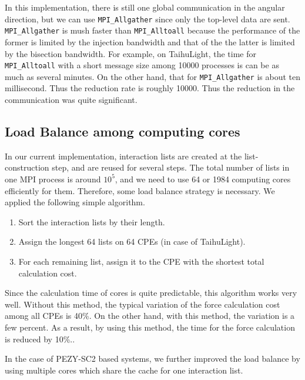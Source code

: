 \documentclass[Afour,sageh,times]{sagej}
\newcommand{\rev}[1]{{#1}}
\begin{document}
In this implementation, there is still one global communication in the
angular direction, but we can use {\tt MPI\_Allgather} since only the
top-level data are sent. \rev{ {\tt MPI\_Allgather} is mush faster
  than {\tt MPI\_Alltoall} because the performance of the former is
  limited by the injection bandwidth and that of the the latter is
  limited by the bisection bandwidth. For example, on TaihuLight, the
  time for {\tt MPI\_Alltoall} with a short message size among 10000
  processes is can be as much as several minutes. On the other hand,
  that for {\tt MPI\_Allgather} is about ten millisecond. Thus the
  reduction rate is roughly 10000.}  Thus the reduction in the
communication was quite significant.


\subsection{Load Balance among computing cores}
\label{subsec:force}

In our current implementation, interaction lists are created at the
list-construction step, and are reused for several steps. The total
number of lists in one MPI process is around $10^5$, and we need to
use 64 or 1984 computing cores efficiently for them. Therefore, some
load balance strategy is necessary. We applied the following simple
algorithm.

\begin{enumerate}
  
\item Sort the interaction lists by their length.

\item Assign the longest 64 lists on 64 CPEs (in case of TaihuLight).

\item For each remaining list, assign it to the CPE with the shortest
  total calculation cost.
  
\end{enumerate}

Since the calculation time of cores is quite predictable, this
algorithm works very well. \rev{Without this method, the typical
  variation of the force calculation cost among all CPEs is 40\%. On
  the other hand, with this method, the variation is a few percent. As
  a result, by using this method, the time for the force calculation
  is reduced by 10\%..}

In the case of PEZY-SC2 based systems, we further improved the load
balance by using multiple cores which share the cache for one
interaction list.
\end{document}
